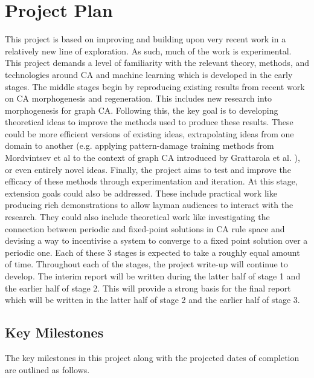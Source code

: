 \chapter{Project Plan}

This project is based on improving and building upon very recent work in a relatively new line of exploration.
As such, much of the work is experimental.
This project demands a level of familiarity with the relevant theory, methods, and technologies around CA and machine learning which is developed in the early stages.
The middle stages begin by reproducing existing results from recent work on CA morphogenesis and regeneration. This includes new research into morphogenesis for graph CA. 
Following this, the key goal is to developing theoretical ideas to improve the methods used to produce these results. These could be more efficient versions of existing ideas, extrapolating ideas from one domain to another (e.g. applying pattern-damage training methods from Mordvintsev et al \cite{mordvintsev2020growing} to the context of graph CA introduced by Grattarola et al. \cite{grattarola2021learning}), or even entirely novel ideas.
Finally, the project aims to test and improve the efficacy of these methods through experimentation and iteration. 
At this stage, extension goals could also be addressed. 
These include practical work like producing rich demonstrations to allow layman audiences to interact with the research. 
They could also include theoretical work like investigating the connection between periodic and fixed-point solutions in CA rule space and devising a way to incentivise a system to converge to a fixed point solution over a periodic one.
Each of these 3 stages is expected to take a roughly equal amount of time.
Throughout each of the stages, the project write-up will continue to develop.
The interim report will be written during the latter half of stage 1 and the earlier half of stage 2.
This will provide a strong basis for the final report which will be written in the latter half of stage 2 and the earlier half of stage 3.

\section{Key Milestones}
The key milestones in this project along with the projected dates of completion are outlined as follows.\\

